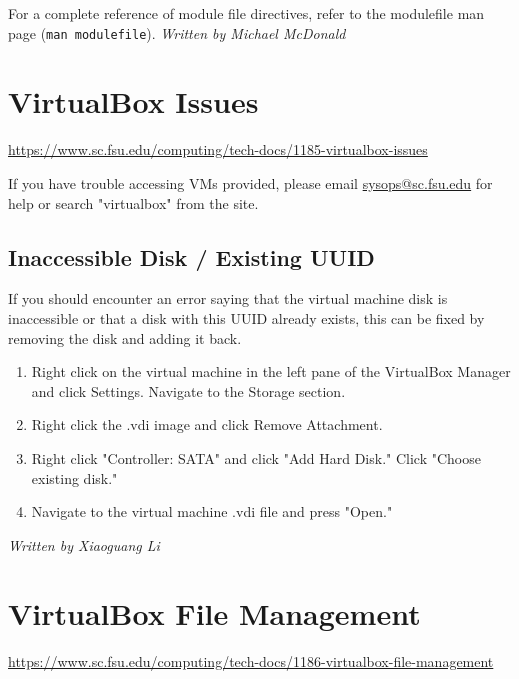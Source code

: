 \documentclass[12pt,a4paper]{article}
\begin{document}
For a complete reference of module file directives, refer to the modulefile man page (\texttt{man modulefile}).
\hfill \textit{Written by Michael McDonald}

\section{VirtualBox Issues}
\url{https://www.sc.fsu.edu/computing/tech-docs/1185-virtualbox-issues}

If you have trouble accessing VMs provided, please email \href{mailto:sysops@sc.fsu.edu}{sysops@sc.fsu.edu} for help or search "virtualbox" from the site.

\subsection*{Inaccessible Disk / Existing UUID}
If you should encounter an error saying that the virtual machine disk is inaccessible or that a disk with this UUID already exists, this can be fixed by removing the disk and adding it back.
\begin{enumerate}
    \item Right click on the virtual machine in the left pane of the VirtualBox Manager and click Settings. Navigate to the Storage section.
    \item Right click the .vdi image and click Remove Attachment.
    \item Right click "Controller: SATA" and click "Add Hard Disk." Click "Choose existing disk."
    \item Navigate to the virtual machine .vdi file and press "Open."
\end{enumerate}
\hfill \textit{Written by Xiaoguang Li}

\section{VirtualBox File Management}
\url{https://www.sc.fsu.edu/computing/tech-docs/1186-virtualbox-file-management}
\end{document}
